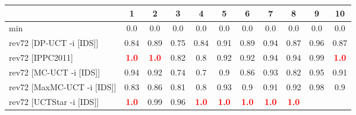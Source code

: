 \documentclass{article}
\begin{document}
\begin{tabular}{|l|r@{$\pm$}rr@{$\pm$}rr@{$\pm$}rr@{$\pm$}rr@{$\pm$}rr@{$\pm$}rr@{$\pm$}rr@{$\pm$}rr@{$\pm$}rr@{$\pm$}r|}
\hline

& \multicolumn{2}{c}{1}
& \multicolumn{2}{c}{2}
& \multicolumn{2}{c}{3}
& \multicolumn{2}{c}{4}
& \multicolumn{2}{c}{5}
& \multicolumn{2}{c}{6}
& \multicolumn{2}{c}{7}
& \multicolumn{2}{c}{8}
& \multicolumn{2}{c}{9}
& \multicolumn{2}{c|}{10}
\\
\hline
\hline
min
& \multicolumn{2}{c}{0.0}
& \multicolumn{2}{c}{0.0}
& \multicolumn{2}{c}{0.0}
& \multicolumn{2}{c}{0.0}
& \multicolumn{2}{c}{0.0}
& \multicolumn{2}{c}{0.0}
& \multicolumn{2}{c}{0.0}
& \multicolumn{2}{c}{0.0}
& \multicolumn{2}{c}{0.0}
& \multicolumn{2}{c|}{0.0}
\\
rev72 [DP-UCT -i [IDS]]
& \multicolumn{2}{c}{0.84}
& \multicolumn{2}{c}{0.89}
& \multicolumn{2}{c}{0.75}
& \multicolumn{2}{c}{0.84}
& \multicolumn{2}{c}{0.91}
& \multicolumn{2}{c}{0.89}
& \multicolumn{2}{c}{0.94}
& \multicolumn{2}{c}{0.87}
& \multicolumn{2}{c}{0.96}
& \multicolumn{2}{c|}{0.87}
\\
rev72 [IPPC2011]
& \multicolumn{2}{c}{\textbf{\textcolor{red}{1.0}}}
& \multicolumn{2}{c}{\textbf{\textcolor{red}{1.0}}}
& \multicolumn{2}{c}{0.82}
& \multicolumn{2}{c}{0.8}
& \multicolumn{2}{c}{0.92}
& \multicolumn{2}{c}{0.92}
& \multicolumn{2}{c}{0.94}
& \multicolumn{2}{c}{0.94}
& \multicolumn{2}{c}{0.99}
& \multicolumn{2}{c|}{\textbf{\textcolor{red}{1.0}}}
\\
rev72 [MC-UCT -i [IDS]]
& \multicolumn{2}{c}{0.94}
& \multicolumn{2}{c}{0.92}
& \multicolumn{2}{c}{0.74}
& \multicolumn{2}{c}{0.7}
& \multicolumn{2}{c}{0.9}
& \multicolumn{2}{c}{0.86}
& \multicolumn{2}{c}{0.93}
& \multicolumn{2}{c}{0.82}
& \multicolumn{2}{c}{0.95}
& \multicolumn{2}{c|}{0.91}
\\
rev72 [MaxMC-UCT -i [IDS]]
& \multicolumn{2}{c}{0.83}
& \multicolumn{2}{c}{0.86}
& \multicolumn{2}{c}{0.81}
& \multicolumn{2}{c}{0.8}
& \multicolumn{2}{c}{0.93}
& \multicolumn{2}{c}{0.9}
& \multicolumn{2}{c}{0.91}
& \multicolumn{2}{c}{0.92}
& \multicolumn{2}{c}{0.98}
& \multicolumn{2}{c|}{0.9}
\\
rev72 [UCTStar -i [IDS]]
& \multicolumn{2}{c}{\textbf{\textcolor{red}{1.0}}}
& \multicolumn{2}{c}{0.99}
& \multicolumn{2}{c}{0.96}
& \multicolumn{2}{c}{\textbf{\textcolor{red}{1.0}}}
& \multicolumn{2}{c}{\textbf{\textcolor{red}{1.0}}}
& \multicolumn{2}{c}{\textbf{\textcolor{red}{1.0}}}
& \multicolumn{2}{c}{\textbf{\textcolor{red}{1.0}}}
& \multicolumn{2}{c}{\textbf{\textcolor{red}{1.0}}}

\end{tabular}
\end{document}
